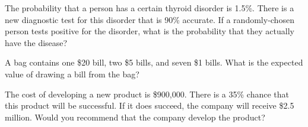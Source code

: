 \documentclass[12pt]{exam}
\begin{document}
\begin{questions}


\newpage

\question[12]
The probability that a person has a certain thyroid disorder is 1.5\%.  There is a new diagnostic test for this disorder that is 90\% accurate.  If a randomly-chosen person tests positive for the disorder, what is the probability that they actually have the disease?

\question[6]
A bag contains one \$20 bill, two \$5 bills, and seven \$1 bills.  What is the expected value of drawing a bill from the bag?


\newpage

\question[16]
The cost of developing a new product is \$900,000.  There is a 35\% chance that this product will be successful.  If it does succeed, the company will receive \$2.5 million.  Would you recommend that the company develop the product?
\end{questions}
\end{document}
